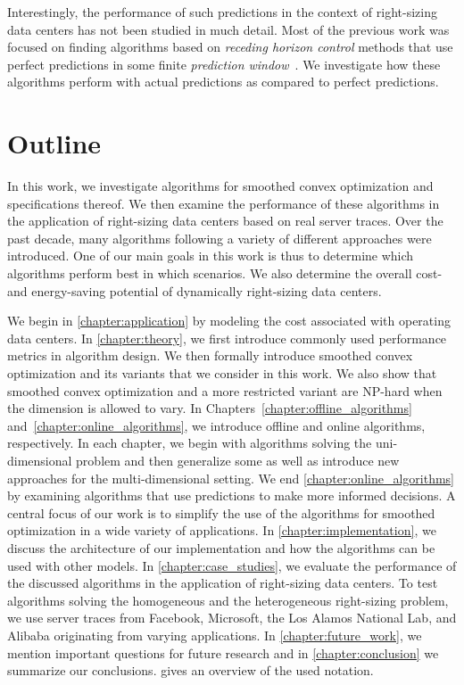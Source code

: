 Interestingly, the performance of such predictions in the context of right-sizing data centers has not been studied in much detail. Most of the previous work was focused on finding algorithms based on \emph{receding horizon control} methods that use perfect predictions in some finite \emph{prediction window}~\cite{Lin2012, Chen2015, Badiei2015, Chen2016, Li2018, Lin2019}. We investigate how these algorithms perform with actual predictions as compared to perfect predictions.

\section{Outline}

In this work, we investigate algorithms for smoothed convex optimization and specifications thereof. We then examine the performance of these algorithms in the application of right-sizing data centers based on real server traces. Over the past decade, many algorithms following a variety of different approaches were introduced. One of our main goals in this work is thus to determine which algorithms perform best in which scenarios. We also determine the overall cost- and energy-saving potential of dynamically right-sizing data centers.

We begin in \cref{chapter:application} by modeling the cost associated with operating data centers. In \cref{chapter:theory}, we first introduce commonly used performance metrics in algorithm design. We then formally introduce smoothed convex optimization and its variants that we consider in this work. We also show that smoothed convex optimization and a more restricted variant are NP-hard when the dimension is allowed to vary. In Chapters~\ref{chapter:offline_algorithms} and~\ref{chapter:online_algorithms}, we introduce offline and online algorithms, respectively. In each chapter, we begin with algorithms solving the uni-dimensional problem and then generalize some as well as introduce new approaches for the multi-dimensional setting. We end \cref{chapter:online_algorithms} by examining algorithms that use predictions to make more informed decisions. A central focus of our work is to simplify the use of the algorithms for smoothed optimization in a wide variety of applications. In \cref{chapter:implementation}, we discuss the architecture of our implementation and how the algorithms can be used with other models. In \cref{chapter:case_studies}, we evaluate the performance of the discussed algorithms in the application of right-sizing data centers. To test algorithms solving the homogeneous and the heterogeneous right-sizing problem, we use server traces from Facebook, Microsoft, the Los Alamos National Lab, and Alibaba originating from varying applications. In \cref{chapter:future_work}, we mention important questions for future research and in \cref{chapter:conclusion} we summarize our conclusions.  gives an overview of the used notation.

